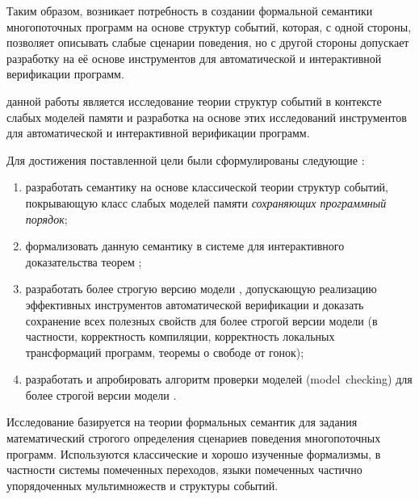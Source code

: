 Таким образом, возникает потребность в создании формальной семантики 
многопоточных программ на основе структур событий, 
которая, с одной стороны, позволяет описывать слабые сценарии поведения, 
но с другой стороны допускает разработку на её основе 
инструментов для автоматической и интерактивной верификации программ. 



{\aim} данной работы является исследование 
теории структур событий в контексте слабых моделей памяти
и разработка на основе этих исследований 
инструментов для автоматической и интерактивной верификации программ. 

Для достижения поставленной цели были сформулированы следующие {\tasks}:
\begin{enumerate}[beginpenalty=10000] %
  \item разработать семантику на основе классической теории структур событий, 
    покрывающую класс слабых моделей памяти \emph{сохраняющих программный порядок};
  \item формализовать данную семантику в системе для интерактивного доказательства теорем \coq;
  \item разработать более строгую версию модели \WkmS, допускающую реализацию 
    эффективных инструментов автоматической верификации
    и доказать сохранение всех полезных свойств \Wkm для более строгой версии модели 
    (в частности, корректность компиляции, корректность локальных трансформаций программ, 
     теоремы о свободе от гонок);
  \item разработать и апробировать алгоритм проверки моделей (model~checking) для 
    более строгой версии модели \Wkm.
\end{enumerate}

{\methods}

Исследование базируется на теории формальных семантик для 
задания математический строгого определения сценариев поведения многопоточных программ. 
Используются классические и хорошо изученные формализмы, в частности 
системы помеченных переходов, языки помеченных частично упорядоченных мультимножеств и структуры событий. 

